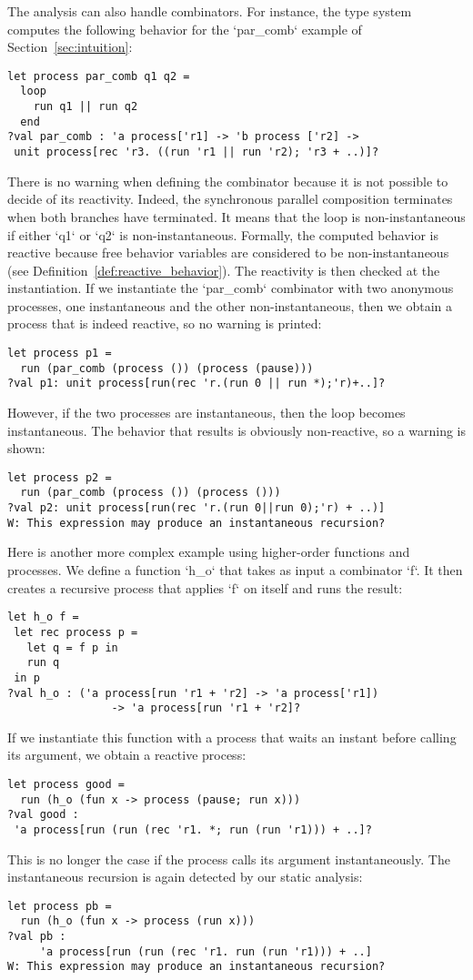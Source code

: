 \documentclass[9pt,preprint]{sigplanconf}
\begin{document}
The analysis can also handle combinators. For instance, the type system computes the following behavior for the `par_comb` example of Section~\ref{sec:intuition}:
\begin{lstlisting}
let process par_comb q1 q2 =
  loop
    run q1 || run q2
  end
?val par_comb : 'a process['r1] -> 'b process ['r2] ->
 unit process[rec 'r3. ((run 'r1 || run 'r2); 'r3 + ..)]?
\end{lstlisting}
%
There is no warning when defining the combinator because it is not possible to decide of its reactivity. Indeed, the synchronous parallel composition terminates when both branches have terminated. It means that the loop is non-instantaneous if either `q1` or `q2` is non-instantaneous. Formally, the computed behavior is reactive because free behavior variables are considered to be non-instantaneous (see Definition~\ref{def:reactive_behavior}). The reactivity is then checked at the instantiation. If we instantiate the `par_comb` combinator with two anonymous processes, one instantaneous and the other non-instantaneous, then we obtain a process that is indeed reactive, so no warning is printed:
\begin{lstlisting}
let process p1 = 
  run (par_comb (process ()) (process (pause)))
?val p1: unit process[run(rec 'r.(run 0 || run *);'r)+..]?
\end{lstlisting}
However, if the two processes are instantaneous, then the loop becomes instantaneous. The behavior that results is obviously non-reactive, so a warning is shown:
\begin{lstlisting}
let process p2 = 
  run (par_comb (process ()) (process ()))
?val p2: unit process[run(rec 'r.(run 0||run 0);'r) + ..)]
W: This expression may produce an instantaneous recursion?
\end{lstlisting}

Here is another more complex example using higher-order functions and processes. We define a function `h_o` that takes as input a combinator `f`. It then creates a recursive process that applies `f` on itself and runs the result:
\begin{lstlisting}
let h_o f =
 let rec process p =
   let q = f p in
   run q
 in p
?val h_o : ('a process[run 'r1 + 'r2] -> 'a process['r1]) 
                -> 'a process[run 'r1 + 'r2]?
\end{lstlisting}
If we instantiate this function with a process that waits an instant before calling its argument, we obtain a reactive process:
\begin{lstlisting}
let process good = 
  run (h_o (fun x -> process (pause; run x)))
?val good :
 'a process[run (run (rec 'r1. *; run (run 'r1))) + ..]?
\end{lstlisting}
This is no longer the case if the process calls its argument instantaneously. The instantaneous recursion is again detected by our static analysis:
\begin{lstlisting}
let process pb = 
  run (h_o (fun x -> process (run x)))
?val pb : 
     'a process[run (run (rec 'r1. run (run 'r1))) + ..]
W: This expression may produce an instantaneous recursion?
\end{lstlisting}
\end{document}
